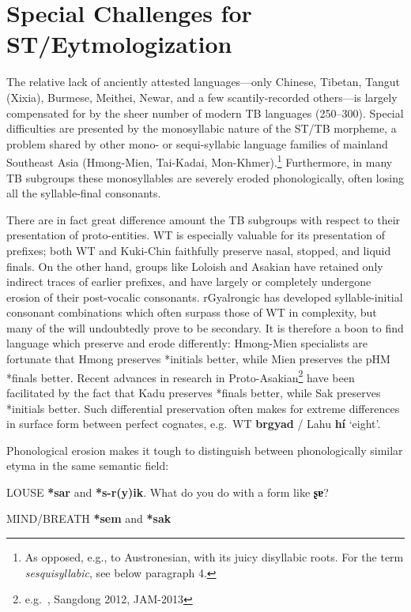 \section{Special Challenges for ST/Eytmologization}

The relative lack of anciently attested languages—only Chinese, Tibetan, Tangut (Xixia), Burmese, Meithei, Newar, and a few scantily-recorded others—is largely compensated for by the sheer number of modern TB languages (250–300). Special difficulties are presented by the monosyllabic nature of the ST/TB morpheme, a problem shared by other mono- or sequi-syllabic language families of mainland Southeast Asia (Hmong-Mien, Tai-Kadai, Mon-Khmer).\footnote{As opposed, e.g., to Austronesian, with its juicy disyllabic roots. For the term \textit{sesquisyllabic}, see below paragraph 4.}
Furthermore, in many TB subgroups these monosyllables are severely eroded phonologically, often losing all the syllable-final consonants.

There are in fact great difference amount the TB subgroups with respect to their presentation of proto-entities. WT is especially valuable for its presentation of prefixes; both WT and Kuki-Chin faithfully preserve nasal, stopped, and liquid finals. On the other hand, groups like Loloish and Asakian have retained only indirect traces of earlier prefixes, and have largely or completely undergone erosion of their post-vocalic consonants.
rGyalrongic has developed syllable-initial consonant combinations which often surpass those of WT in complexity, but many of the will undoubtedly prove to be secondary.
It is therefore a boon to find language which preserve and erode differently: Hmong-Mien specialists are fortunate that Hmong preserves *initials better, while Mien preserves the pHM *finals better.
Recent advances in research in Proto-Asakian\footnote{e.g.\ \citealt{HK-Sak}, Sangdong 2012, JAM-2013} have been facilitated by the fact that Kadu preserves *finals better, while Sak preserves *initials better.
Such differential preservation often makes for extreme differences in surface form between perfect cognates, e.g.\ WT \textbf{brgyad} / Lahu \textbf{hí} ‘eight’.

Phonological erosion makes it tough to distinguish between phonologically similar etyma in the same semantic field:

LOUSE \textbf{*sar} and \textbf{*s-r(y)ik}. What do you do with a form like \textbf{ʂɐ}?

MIND/BREATH \textbf{*sem} and \textbf{*sak}

